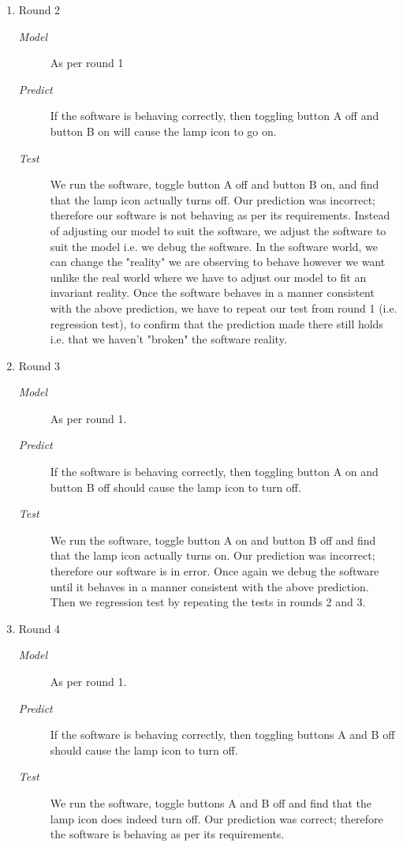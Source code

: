 \documentclass{article}
\begin{document}
\begin{enumerate}
\begin{enumerate}
\item Round 2
\label{sec:orgheadline394}

\begin{description}
\item[{\emph{Model}}] As per round 1
\item[{\emph{Predict}}] If the software is behaving correctly, then toggling
button A off and button B on will cause the lamp icon to go on.
\item[{\emph{Test}}] We run the software, toggle button A off and button B on,
and find that the lamp icon actually turns off. Our prediction was
incorrect; therefore our software is not behaving as per its
requirements. Instead of adjusting our model to suit the software, we
adjust the software to suit the model i.e. we debug the software. In
the software world, we can change the "reality" we are observing to
behave however we want unlike the real world where we have to adjust
our model to fit an invariant reality. Once the software behaves in a
manner consistent with the above prediction, we have to repeat our
test from round 1 (i.e. regression test), to confirm that the
prediction made there still holds i.e. that we haven't "broken" the
software reality.
\end{description}

\item Round 3
\label{sec:orgheadline395}

\begin{description}
\item[{\emph{Model}}] As per round 1.
\item[{\emph{Predict}}] If the software is behaving correctly, then toggling
button A on and button B off should cause the lamp icon to turn off.
\item[{\emph{Test}}] We run the software, toggle button A on and button B off
and find that the lamp icon actually turns on. Our prediction was
incorrect; therefore our software is in error. Once again we debug
the software until it behaves in a manner consistent with the above
prediction. Then we regression test by repeating the tests in rounds
2 and 3.
\end{description}

\item Round 4
\label{sec:orgheadline396}

\begin{description}
\item[{\emph{Model}}] As per round 1.
\item[{\emph{Predict}}] If the software is behaving correctly, then toggling
buttons A and B off should cause the lamp icon to turn off.
\item[{\emph{Test}}] We run the software, toggle buttons A and B off and find
that the lamp icon does indeed turn off. Our prediction was correct;
therefore the software is behaving as per its requirements.
\end{description}


\end{enumerate}
\end{enumerate}
\end{document}
